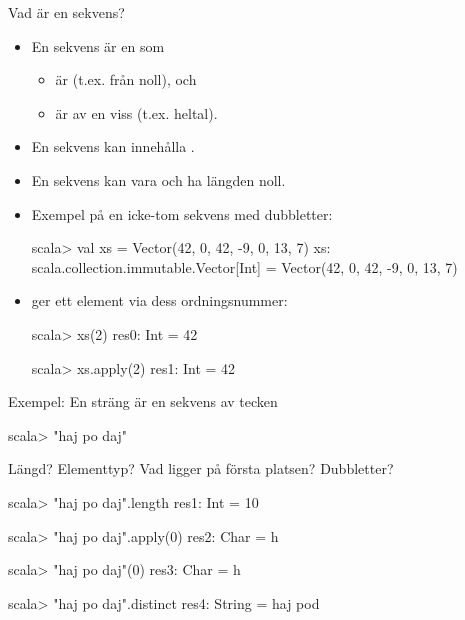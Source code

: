 

\begin{Slide}{Vad är en sekvens?}
\begin{itemize}
\item En sekvens är en  som
  \begin{itemize}
   \item är  (t.ex. från noll), och
   \item är av en viss  (t.ex. heltal).
  \end{itemize}
  \pause
\item En sekvens kan innehålla .
\item En sekvens kan vara  och ha längden noll.
\item Exempel på en icke-tom sekvens med dubbletter:
\begin{REPLnonum}
scala> val xs = Vector(42, 0, 42, -9, 0, 13, 7)
xs: scala.collection.immutable.Vector[Int] =
  Vector(42, 0, 42, -9, 0, 13, 7)
\end{REPLnonum}
\pause
\item {} ger ett element via dess ordningsnummer:
\begin{REPLnonum}
scala> xs(2)
res0: Int = 42

scala> xs.apply(2)
res1: Int = 42
\end{REPLnonum}
\end{itemize}
\end{Slide}

\begin{Slide}{Exempel: En sträng är en sekvens av tecken}
\begin{REPLnonum}
scala> "haj po daj"
\end{REPLnonum}
Längd? Elementtyp?
Vad ligger på första platsen?
Dubbletter?
\pause
\begin{REPLnonum}
scala> "haj po daj".length
res1: Int = 10

scala> "haj po daj".apply(0)
res2: Char = h

scala> "haj po daj"(0)
res3: Char = h

scala> "haj po daj".distinct
res4: String = haj pod
\end{REPLnonum}

\end{Slide}


